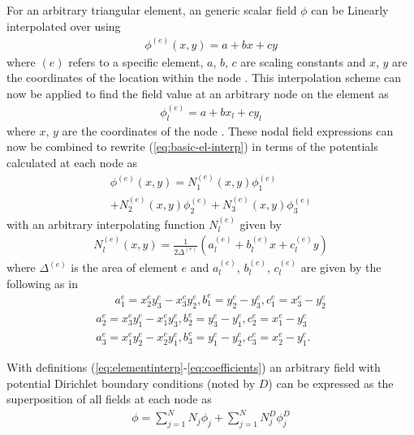 For an arbitrary triangular element, an generic scalar field $\phi$ can be Linearly interpolated over using
\begin{align}
	\phi^{(e)}(x,y)=a+bx+cy
	\label{eq:basic-el-interp}
\end{align} 
where $(e)$ refers to a specific element, $a$, $b$, $c$ are scaling constants and $x$, $y$ are the coordinates of the location within the node \cite{jin2011theory}. This interpolation scheme can now be applied to find the field value at an arbitrary node on the element as
\begin{align}
	\phi^{(e)}_l=a+bx_l+cy_l
	\label{eq:node-interp}
\end{align}
where $x$, $y$ are the coordinates of the node \cite{jin2011theory}. These nodal field expressions can now be combined to rewrite (\ref{eq:basic-el-interp}) in terms of the potentials calculated at each node as
\begin{multline}
	\phi^{(e)}(x,y)=N_1^{(e)}(x,y)\phi^{(e)}_1\\+N_2^{(e)}(x,y)\phi^{(e)}_2+N_3^{(e)}(x,y)\phi^{(e)}_3
	\label{eq:elementinterp}
\end{multline} with an arbitrary interpolating function $N_l^{(e)}$ given by 
\begin{align}
	N_l^{(e)}(x,y)=\frac{1}{2\Delta^{(e)}}\left(a_l^{(e)}+b_l^{(e)}x+c_l^{(e)}y\right)
\end{align}
where $\Delta^{(e)}$ is the area of element $e$ and $a_l^{(e)}$, $b_l^{(e)}$, $c_l^{(e)}$ are given by the following as in \cite{jin2011theory}
\begin{multline}
	\quad \ \ \ a_1^{e} = x^{e}_2y^{e}_3-x^{e}_3y^{e}_2,b_1^{e}=y^{e}_2-y^{e}_3, c_1^{e}=x^{e}_3-y^{e}_2
	\\
	a_2^{e} = x^{e}_3y^{e}_1-x^{e}_1y^{e}_3,b_2^{e}=y^{e}_3-y^{e}_1, c_2^{e}=x^{e}_1-y^{e}_3
	\\
	a_3^{e} = x^{e}_1y^{e}_2-x^{e}_2y^{e}_1,b_3^{e}=y^{e}_1-y^{e}_2, c_3^{e}=x^{e}_2-y^{e}_1.
	\label{eq:coefficients}
\end{multline}

With definitions (\ref{eq:elementinterp}-\ref{eq:coefficients}) an arbitrary field with potential Dirichlet boundary conditions (noted by $D$) can be expressed as the superposition of all fields at each node as 
\begin{align}
	\phi=\sum_{j=1}^{N}N_j\phi_j+\sum_{j=1}^{N}N_j^D\phi_j^D
	\label{eq:genericfield}
\end{align}

